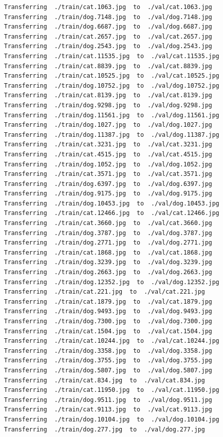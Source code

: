 \documentclass[]{book}
\theoremstyle{definition}
\theoremstyle{definition}
\theoremstyle{definition}
\theoremstyle{remark}
\begin{document}
\begin{verbatim}
Transferring  ./train/cat.1063.jpg  to  ./val/cat.1063.jpg
Transferring  ./train/dog.7148.jpg  to  ./val/dog.7148.jpg
Transferring  ./train/dog.6687.jpg  to  ./val/dog.6687.jpg
Transferring  ./train/cat.2657.jpg  to  ./val/cat.2657.jpg
Transferring  ./train/dog.2543.jpg  to  ./val/dog.2543.jpg
Transferring  ./train/cat.11535.jpg  to  ./val/cat.11535.jpg
Transferring  ./train/cat.8839.jpg  to  ./val/cat.8839.jpg
Transferring  ./train/cat.10525.jpg  to  ./val/cat.10525.jpg
Transferring  ./train/dog.10752.jpg  to  ./val/dog.10752.jpg
Transferring  ./train/cat.8139.jpg  to  ./val/cat.8139.jpg
Transferring  ./train/dog.9298.jpg  to  ./val/dog.9298.jpg
Transferring  ./train/dog.11561.jpg  to  ./val/dog.11561.jpg
Transferring  ./train/dog.1027.jpg  to  ./val/dog.1027.jpg
Transferring  ./train/dog.11387.jpg  to  ./val/dog.11387.jpg
Transferring  ./train/cat.3231.jpg  to  ./val/cat.3231.jpg
Transferring  ./train/cat.4515.jpg  to  ./val/cat.4515.jpg
Transferring  ./train/dog.1052.jpg  to  ./val/dog.1052.jpg
Transferring  ./train/cat.3571.jpg  to  ./val/cat.3571.jpg
Transferring  ./train/dog.6397.jpg  to  ./val/dog.6397.jpg
Transferring  ./train/dog.9175.jpg  to  ./val/dog.9175.jpg
Transferring  ./train/dog.10453.jpg  to  ./val/dog.10453.jpg
Transferring  ./train/cat.12466.jpg  to  ./val/cat.12466.jpg
Transferring  ./train/cat.3660.jpg  to  ./val/cat.3660.jpg
Transferring  ./train/dog.3787.jpg  to  ./val/dog.3787.jpg
Transferring  ./train/dog.2771.jpg  to  ./val/dog.2771.jpg
Transferring  ./train/cat.1868.jpg  to  ./val/cat.1868.jpg
Transferring  ./train/dog.3239.jpg  to  ./val/dog.3239.jpg
Transferring  ./train/dog.2663.jpg  to  ./val/dog.2663.jpg
Transferring  ./train/dog.12352.jpg  to  ./val/dog.12352.jpg
Transferring  ./train/cat.221.jpg  to  ./val/cat.221.jpg
Transferring  ./train/cat.1879.jpg  to  ./val/cat.1879.jpg
Transferring  ./train/dog.9493.jpg  to  ./val/dog.9493.jpg
Transferring  ./train/dog.7300.jpg  to  ./val/dog.7300.jpg
Transferring  ./train/cat.1504.jpg  to  ./val/cat.1504.jpg
Transferring  ./train/cat.10244.jpg  to  ./val/cat.10244.jpg
Transferring  ./train/dog.3358.jpg  to  ./val/dog.3358.jpg
Transferring  ./train/dog.3755.jpg  to  ./val/dog.3755.jpg
Transferring  ./train/dog.5807.jpg  to  ./val/dog.5807.jpg
Transferring  ./train/cat.834.jpg  to  ./val/cat.834.jpg
Transferring  ./train/cat.11950.jpg  to  ./val/cat.11950.jpg
Transferring  ./train/dog.9511.jpg  to  ./val/dog.9511.jpg
Transferring  ./train/cat.9113.jpg  to  ./val/cat.9113.jpg
Transferring  ./train/dog.10104.jpg  to  ./val/dog.10104.jpg
Transferring  ./train/dog.277.jpg  to  ./val/dog.277.jpg

\end{verbatim}
\end{document}
